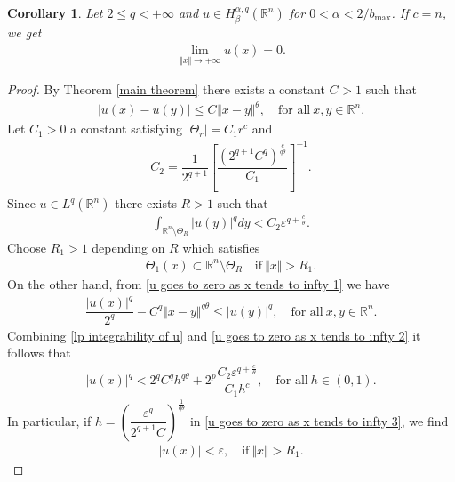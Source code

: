 \documentclass[10pt, leqno]{article}
\newtheorem{corollary}[theorem]{Corollary}
\theoremstyle{definition}
\theoremstyle{remark}
\numberwithin{equation}{section}
\begin{document}
\begin{corollary}
\label{u goes to zero as x tends to infty lemma}
Let $2 \leq q < +\infty$ and $u \in H^{\alpha, q}_{\beta} \left( \mathbb{R}^{n} \right)$ for $0 < \alpha < 2/b_{\max}$. If $c=n$, we get
\begin{eqnarray}
\label{u goes to zero as x tends to infty}
\lim_{\Vert x \Vert \rightarrow +\infty } u(x) = 0.
\end{eqnarray}
\end{corollary}
\begin{proof}
By Theorem \ref{main theorem} there exists a constant $C_{}>1$ such that
\begin{eqnarray}
\label{u goes to zero as x tends to infty 1}
\vert u(x) - u(y) \vert \leq C_{} \Vert x - y \Vert^{\theta}, \quad \text{for all} \ x,y \in \mathbb{R}^{n}.
\end{eqnarray}
Let $C_{1}>0$ a constant satisfying $\vert \Theta_{r} \vert = C_{1}r^{c}$ and
\begin{eqnarray}
C_{2} = \dfrac{1}{2^{q+1}}\left[ \dfrac{\left(2^{q+1} C^{q}_{} \right)^{\frac{c}{q \theta}}}{C_{1}} \right]^{-1}.
\end{eqnarray}
Since $u \in L^{q}\left(\mathbb{R}^{n}\right)$ there exists $R > 1$ such that
\begin{eqnarray}
\label{lp integrability of u}
\int_{\mathbb{R}^{n} \setminus \Theta_{R}} \vert u(y) \vert^{q} dy  < C_{2}\varepsilon^{q + \frac{c}{ \theta}}.
\end{eqnarray}
Choose $R_{1} > 1$ depending on $R$ which satisfies
\begin{eqnarray}
\Theta_{1}(x) \subset \mathbb{R}^{n} \setminus \Theta_{R} \quad \text{if} \ \Vert x \Vert > R_{1}.
\end{eqnarray}
On the other hand, from \eqref{u goes to zero as x tends to infty 1} we have
\begin{eqnarray}
\label{u goes to zero as x tends to infty 2}
\dfrac{\vert u(x) \vert^{q}}{2^{q}} - C^{q}_{} \Vert x - y \Vert^{q\theta} \leq \vert u(y) \vert^{q}, \quad \text{for all} \ x,y \in \mathbb{R}^{n}.
\end{eqnarray}
Combining \eqref{lp integrability of u} and \eqref{u goes to zero as x tends to infty 2} it follows that
\begin{eqnarray}
\label{u goes to zero as x tends to infty 3}
\vert u(x) \vert^{q} < 2^{q} C^{q}_{} h^{q \theta} + 2^{p} \dfrac{C_{2}\varepsilon^{q + \frac{c}{ \theta}}}{C_{1}h^{c}}, \quad \text{for all} \ h \in (0, 1).
\end{eqnarray}
In particular, if $h = \left( \dfrac{\varepsilon^{q}}{2^{q+1}C_{}}\right)^{\frac{1}{q\theta}}$ in \eqref{u goes to zero as x tends to infty 3}, we find
\begin{eqnarray}
\vert u(x) \vert < \varepsilon, \quad \text{if} \ \Vert x \Vert > R_{1}.
\end{eqnarray}
\end{proof}
\end{document}
